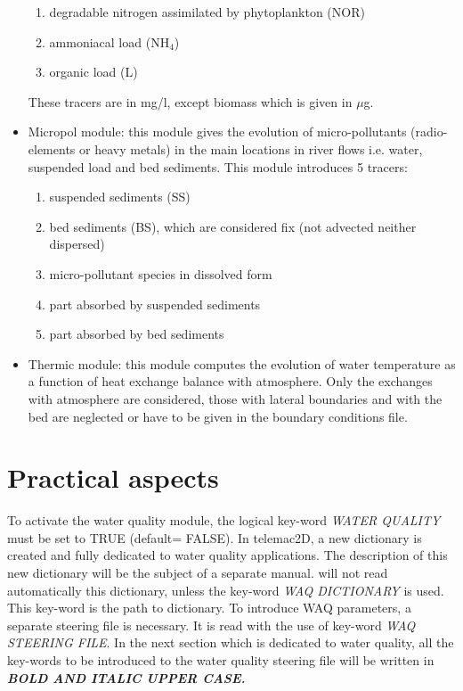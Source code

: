 \begin{itemize}
\begin{enumerate}
\item  degradable nitrogen assimilated by phytoplankton (NOR)

\item  ammoniacal load (NH${}_{4}$)

\item  organic load (L)
\end{enumerate}

     These tracers are in mg/l, except biomass which is given in $\mu$g.

\item  Micropol module:  this module gives the evolution of micro-pollutants (radio-elements or heavy metals) in the main locations in river flows i.e. water, suspended load and bed sediments. This module introduces 5 tracers:
\begin{enumerate}
\item  suspended sediments (SS)

\item  bed sediments (BS), which are considered fix (not advected neither dispersed)

\item  micro-pollutant species in dissolved form

\item  part absorbed by suspended sediments

\item  part absorbed by bed sediments
\end{enumerate}

\item  Thermic module: this module computes the evolution of water temperature as a function of heat exchange balance with atmosphere. Only the exchanges with atmosphere are considered, those with lateral boundaries and with the bed are neglected or have to be given in the boundary conditions file.
\end{itemize}


\section{ Practical aspects}



 To activate the water quality module, the logical key-word \textit{WATER QUALITY} must be set to TRUE (default= FALSE).  In telemac2D, a new dictionary is created and fully dedicated to water quality applications. The description of this new dictionary will be the subject of a separate manual.  will not read automatically this dictionary, unless the key-word \textit{WAQ DICTIONARY} is used. This key-word is the path to dictionary. To introduce WAQ parameters, a separate steering file is necessary. It is read with the use of key-word \textit{WAQ STEERING FILE}. In the next section which is dedicated to water quality, all the key-words to be introduced to the water quality steering file will be written in \textbf{\textit{BOLD AND ITALIC UPPER CASE.}}

